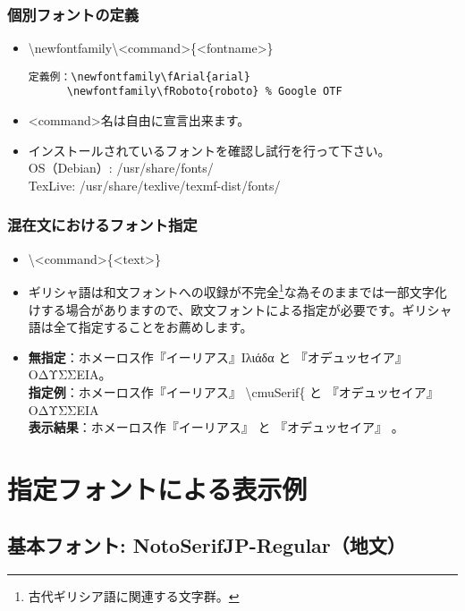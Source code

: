 \documentclass[a4paper,10pt]{ltjsarticle}
\def\colH#1{\color[HTML]{#1}}
\begin{document}
\subsubsection{個別フォントの定義}
\begin{itemize}
  \item[] {\colH{800000} \textbackslash newfontfamily\textbackslash<command>\{<fontname>\}}
\vspace{-2mm}
\begin{verbatim}
定義例：\newfontfamily\fArial{arial}
      \newfontfamily\fRoboto{roboto} % Google OTF
\end{verbatim} 
\vspace{-2mm}
  \item <command>名は自由に宣言出来ます。  
  \item インストールされているフォントを確認し試行を行って下さい。\\
OS（Debian）: /usr/share/fonts/\\
TexLive: /usr/share/texlive/texmf-dist/fonts/
\end{itemize}

\subsubsection{混在文におけるフォント指定}
\begin{itemize}
  \item[] {\colH{800000} \textbackslash <command>\{<text>\}}
    \item ギリシャ語は和文フォントへの収録が不完全\footnote{古代ギリシア語に関連する文字群。}な為そのままでは一部文字化けする場合がありますので、欧文フォントによる指定が必要です。ギリシャ語は全て指定することをお薦めします。
  \item[] 
  \textbf{無指定}：ホメーロス作『イーリアス』Ιλι{\colH{800000}ά}δα と 『オデュッセイア』ΟΔΥΣΣΕΙΑ。\\
  \textbf{指定例}：ホメーロス作『イーリアス』 {\colH{800000}\textbackslash cmuSerif\{}\cmuSerif{Ιλιάδα}{\colH{800000}\}} と 『オデュッセイア』ΟΔΥΣΣΕΙΑ\\
  \textbf{表示結果}：ホメーロス作『イーリアス』 と 『オデュッセイア』 。
\end{itemize}

\section{指定フォントによる表示例}
\subsection{基本フォント: \textcolor{rred}{NotoSerifJP-Regular}（地文）}
\end{document}

